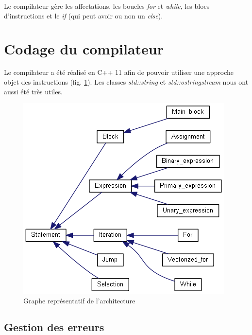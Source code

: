 \documentclass[a4paper,8pt,french,fleqn]{article}
\begin{document}
Le compilateur gère les affectations, les boucles \textit{for} et \textit{while}, les blocs d'instructions et le \textit{if} (qui peut avoir ou non un \textit{else}).


\section{Codage du compilateur}
Le compilateur a été réalisé en C++ 11 afin de pouvoir utiliser une approche objet des instructions (fig. \ref{archi}). Les classes \textit{std::string} et \textit{std::ostringstream} nous ont aussi été très utiles.

\begin{figure}[h!]
\includegraphics[scale = 0.8]{inherit_graph.png}
\caption{Graphe représentatif de l'architecture}
\label{archi}
\end{figure}

\subsection{Gestion des erreurs}
\end{document}
